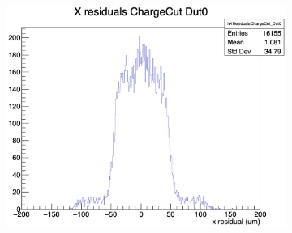 \begin{figure}[H]
\begin{subfigure}[b]{0.3\textwidth}
        \includegraphics[width=\textwidth]{images/XRes_NoBin0_4pixel.png}
        \caption{}
    \end{subfigure}

    \vspace{0.5cm} %


\end{figure}
